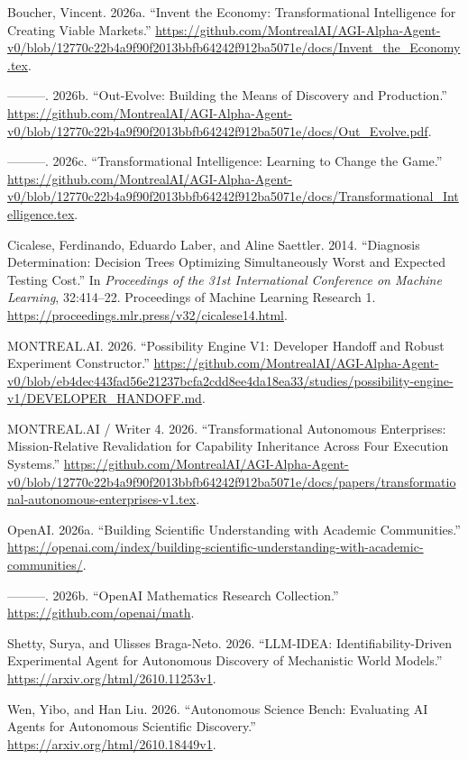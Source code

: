 \documentclass[10pt,letterpaper]{article}
\newenvironment{CSLReferences}[2]{\begingroup\small\setlength{\parindent}{0pt}\setlength{\parskip}{6pt}}{\endgroup}
\begin{document}
\hypertarget{refs}{}
\begin{CSLReferences}{1}{0}
\leavevmode{}%
Boucher, Vincent. 2026a. {``Invent the Economy: Transformational
Intelligence for Creating Viable Markets.''}
\url{https://github.com/MontrealAI/AGI-Alpha-Agent-v0/blob/12770c22b4a9f90f2013bbfb64242f912ba5071e/docs/Invent_the_Economy.tex}.

\leavevmode{}%
---------. 2026b. {``Out-Evolve: Building the Means of Discovery and
Production.''}
\url{https://github.com/MontrealAI/AGI-Alpha-Agent-v0/blob/12770c22b4a9f90f2013bbfb64242f912ba5071e/docs/Out_Evolve.pdf}.

\leavevmode{}%
---------. 2026c. {``Transformational Intelligence: Learning to Change
the Game.''}
\url{https://github.com/MontrealAI/AGI-Alpha-Agent-v0/blob/12770c22b4a9f90f2013bbfb64242f912ba5071e/docs/Transformational_Intelligence.tex}.

\leavevmode{}%
Cicalese, Ferdinando, Eduardo Laber, and Aline Saettler. 2014.
{``Diagnosis Determination: Decision Trees Optimizing Simultaneously
Worst and Expected Testing Cost.''} In \emph{Proceedings of the 31st
International Conference on Machine Learning}, 32:414--22. Proceedings
of Machine Learning Research 1.
\url{https://proceedings.mlr.press/v32/cicalese14.html}.

\leavevmode{}%
MONTREAL.AI. 2026. {``Possibility Engine V1: Developer Handoff and
Robust Experiment Constructor.''}
\url{https://github.com/MontrealAI/AGI-Alpha-Agent-v0/blob/eb4dec443fad56e21237bcfa2cdd8ee4da18ea33/studies/possibility-engine-v1/DEVELOPER_HANDOFF.md}.

\leavevmode{}%
MONTREAL.AI / Writer 4. 2026. {``Transformational Autonomous
Enterprises: Mission-Relative Revalidation for Capability Inheritance
Across Four Execution Systems.''}
\url{https://github.com/MontrealAI/AGI-Alpha-Agent-v0/blob/12770c22b4a9f90f2013bbfb64242f912ba5071e/docs/papers/transformational-autonomous-enterprises-v1.tex}.

\leavevmode{}%
OpenAI. 2026a. {``Building Scientific Understanding with Academic
Communities.''}
\url{https://openai.com/index/building-scientific-understanding-with-academic-communities/}.

\leavevmode{}%
---------. 2026b. {``OpenAI Mathematics Research Collection.''}
\url{https://github.com/openai/math}.

\leavevmode{}%
Shetty, Surya, and Ulisses Braga-Neto. 2026. {``LLM-IDEA:
Identifiability-Driven Experimental Agent for Autonomous Discovery of
Mechanistic World Models.''} \url{https://arxiv.org/html/2610.11253v1}.

\leavevmode{}%
Wen, Yibo, and Han Liu. 2026. {``Autonomous Science Bench: Evaluating AI
Agents for Autonomous Scientific Discovery.''}
\url{https://arxiv.org/html/2610.18449v1}.

\end{CSLReferences}
\end{document}
